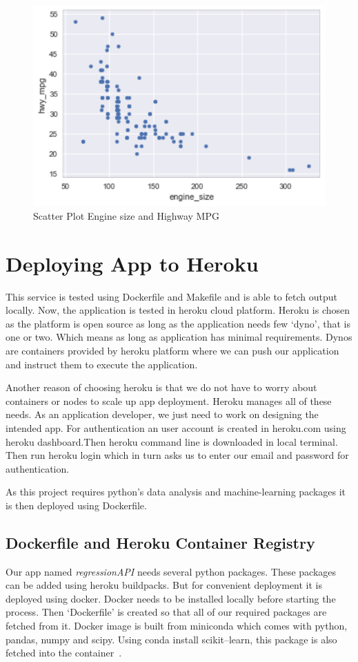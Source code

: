   \begin{figure}[h!]
  \includegraphics[scale=1.0]{images/scatterplot.pdf}
  \caption{Scatter Plot Engine size and Highway MPG}
\label{fig:scatterplt}
\end{figure} 
 
\section{Deploying App to Heroku} 

This service is tested using Dockerfile and Makefile and is able to fetch
output locally. Now, the application is tested in heroku cloud platform. Heroku
is chosen as the platform is open source as long as the application needs few 
`dyno', that is one or two. Which means as long as application has minimal
requirements. Dynos are containers provided by heroku platform where we can 
push our application and instruct them to execute the application.

Another reason of choosing heroku is that we do not have to worry about 
containers or nodes to scale up app deployment. Heroku manages all of these
needs. As an application developer, we just need to work on designing the 
intended app. For authentication an user account is created in heroku.com
using heroku dashboard.Then heroku command line is downloaded in local terminal.
Then run heroku login which in turn asks us to enter our email and password
for authentication.

As this project requires python's data analysis and machine-learning packages 
it is then deployed using Dockerfile. 

\subsection{Dockerfile and Heroku Container Registry}
 Our app named \textit{regressionAPI} needs several python packages. These
 packages can be added using heroku buildpacks. But for convenient deployment
 it is deployed using docker. Docker needs to be installed locally before 
 starting the process. Then `Dockerfile' is created  so that
 all of our required packages are fetched from it. Docker image is built from
 miniconda which comes with python, pandas, numpy and scipy. Using conda install
 scikit--learn, this package is also fetched into the 
 container~\cite{hid-sp18-415-dockerfile}.  


